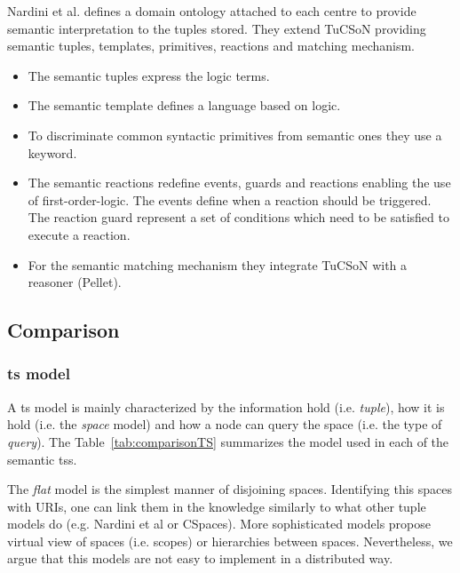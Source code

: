 Nardini et al. defines a domain ontology attached to each centre to provide semantic interpretation to the tuples stored.
They extend TuCSoN providing semantic tuples, templates, primitives, reactions and matching mechanism.
\begin{itemize}
  \item The semantic tuples express the logic terms.
  \item The semantic template defines a language based on logic.
  \item To discriminate common syntactic primitives from semantic ones they use a keyword.
  \item The semantic reactions redefine events, guards and reactions enabling the use of first-order-logic.
	The events define when a reaction should be triggered.
	The reaction guard represent a set of conditions which need to be satisfied to execute a reaction.
  \item For the semantic matching mechanism they integrate TuCSoN with a reasoner (Pellet). %
\end{itemize}



\subsection{Comparison}


\subsubsection{\acl{ts} model}

A \acl{ts} model is mainly characterized by the information hold (i.e. \emph{tuple}),
how it is hold (i.e. the \emph{space} model)
and how a node can query the space (i.e. the type of \emph{query}).
The Table~\ref{tab:comparisonTS} summarizes the model used in each of the semantic \aclp{ts}.

The \emph{flat} model is the simplest manner of disjoining spaces.
Identifying this spaces with URIs, one can link them in the knowledge similarly to what other tuple models do (e.g. Nardini et al or CSpaces). %
More sophisticated models propose virtual view of spaces (i.e. scopes) or hierarchies between spaces.
Nevertheless, we argue that this models are not easy to implement in a distributed way. %

